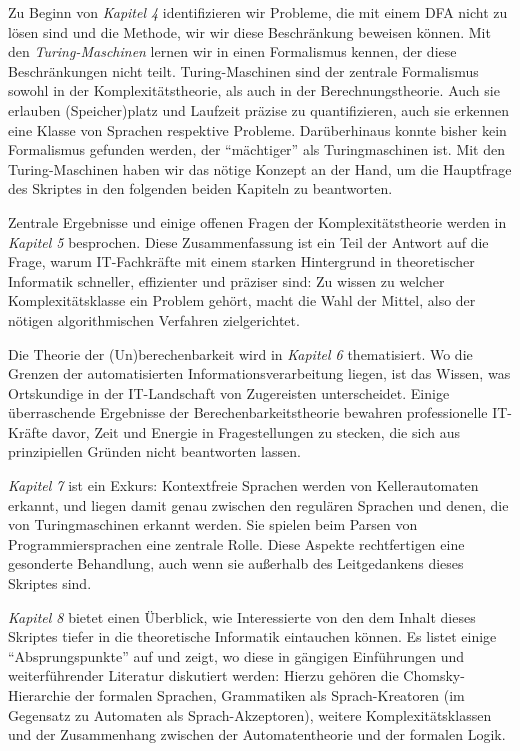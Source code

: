 Zu Beginn von \emph{Kapitel 4} identifizieren wir Probleme,
die mit einem DFA nicht zu lösen sind
und die Methode, wir wir diese Beschränkung beweisen können.
Mit den \emph{Turing-Maschinen} lernen wir in einen Formalismus kennen,
der diese Beschränkungen nicht teilt.
Turing-Maschinen sind der zentrale Formalismus sowohl
in der Komplexitätstheorie,
als auch in der Berechnungstheorie.
Auch sie erlauben (Speicher)platz und Laufzeit präzise zu quantifizieren,
auch sie erkennen eine Klasse von Sprachen respektive Probleme.
Darüberhinaus konnte bisher kein Formalismus gefunden werden,
der ``mächtiger'' als Turingmaschinen ist.
Mit den Turing-Maschinen haben wir das nötige Konzept an der Hand,
um die Hauptfrage des Skriptes in den folgenden beiden Kapiteln zu beantworten.

Zentrale Ergebnisse und einige offenen Fragen der Komplexitätstheorie
werden in \emph{Kapitel 5} besprochen.
Diese Zusammenfassung ist ein Teil der Antwort auf die Frage,
warum IT-Fachkräfte mit einem starken Hintergrund in theoretischer Informatik
schneller, effizienter und präziser sind:
Zu wissen zu welcher Komplexitätsklasse ein Problem gehört,
macht die Wahl der Mittel,
also der nötigen algorithmischen Verfahren zielgerichtet.

Die Theorie der (Un)berechenbarkeit wird in \emph{Kapitel 6} thematisiert.
Wo die Grenzen der automatisierten Informationsverarbeitung liegen,
ist das Wissen,
was Ortskundige in der IT-Landschaft von Zugereisten unterscheidet.
Einige überraschende Ergebnisse der Berechenbarkeitstheorie
bewahren professionelle IT-Kräfte davor,
Zeit und Energie in Fragestellungen zu stecken,
die sich aus prinzipiellen Gründen nicht beantworten lassen.

\emph{Kapitel 7} ist ein Exkurs: Kontextfreie Sprachen werden von Kellerautomaten erkannt,
und liegen damit genau zwischen den regulären Sprachen
und denen, die von Turingmaschinen erkannt werden.
Sie spielen beim Parsen von Programmiersprachen eine zentrale Rolle.
Diese Aspekte rechtfertigen eine gesonderte Behandlung,
auch wenn sie außerhalb des Leitgedankens dieses Skriptes sind.

\emph{Kapitel 8} bietet einen Überblick,
wie Interessierte von den dem Inhalt dieses Skriptes tiefer in die theoretische Informatik
eintauchen können.
Es listet einige ``Absprungspunkte'' auf und zeigt,
wo diese in gängigen Einführungen und weiterführender Literatur diskutiert werden:
Hierzu gehören die Chomsky-Hierarchie der formalen Sprachen,
Grammatiken als Sprach-Kreatoren (im Gegensatz zu Automaten als Sprach-Akzeptoren),
weitere Komplexitätsklassen und
der Zusammenhang zwischen der Automatentheorie und der formalen Logik.

